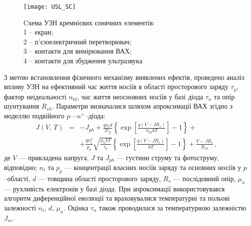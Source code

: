 \begin{SCfigure}
\texttt{[image: USL\_SC]}
\caption{\label{USL_SC}
Cхема УЗН кремнієвих сонячних елементів: \protect\\
1 --  екран;\protect\\
2 -- п'єзоелектричний перетворювач;\protect\\
3 -- контакти для вимірювання ВАХ;\protect\\
4 -- контакти для збудження ультразвука
}
\end{SCfigure}

З метою встановлення фізичного механізму
виявлених ефектів, проведено аналіз впливу УЗН на
ефективний час життя носіїв в області просторового заряду $\tau_{g}$,
фактор неідеальності $n_\mathrm{id}$,
час життя неосновних носіїв у базі діода $\tau_n$
та  опір шунтування $R_{sh}$.
Параметри визначалися шляхом апроксимації ВАХ згідно з моделлю подвійного $p$---$n^+$--діода:
\begin{eqnarray}
\label{eqSSCIV}
\nonumber J(V,\,T)&=&-J_{ph}+\frac{qn_id}{2\tau_{g}}\left\{\exp \left[\frac{q(V-JR_s)}{n_\mathrm{id}kT}\right]-1\right\}+\\
&&+\frac{qn_i^2}{p_p}\sqrt{\frac{\mu_nkT}{\tau_n}}\left\{\exp \left[\frac{q(V-JR_s)}{kT}\right]-1\right\}+\frac{V-JR_s}{R_{sh}}\,,
\end{eqnarray}
де
$V$ --- прикладена напруга,
$J$ та $J_{ph}$ --- густини струму та фотоструму, відповідно;
$n_i$ та $p_p$ --- концентрації власних носіїв заряду та основних носіїв у $p$--області,
$d$ --- товщина області просторового заряду,
$R_s$ --- послідовний опір,
$\mu_n$ --- рухливість електронів у базі діода.
При апроксимації використовувався алгоритм диференційної еволюції та враховувалися температурні та польові залежності $n_i$, $d$, $\mu_n$.
Оцінка $\tau_n$ також проводилася за температурною залежністю $J_{sc}$.

